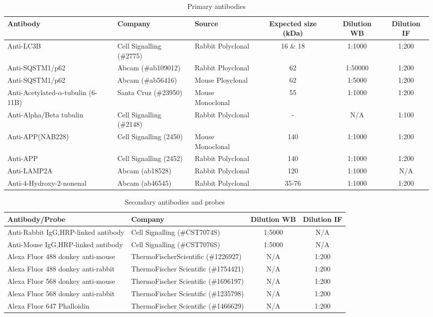 \begin{landscape}
\begin{table}[p]
\centering
\caption[Primary antibodies]{Primary antibodies}
\label{tab:20_prim}
\begin{tabular}{lllccc}
\toprule
Antibody & Company & Source & Expected size (kDa) & Dilution WB & Dilution IF \\
\midrule
Anti-LC3B & Cell Signalling (\#2775) & Rabbit Polyclonal & 16 \& 18 & 1:1000 & 1:200 \\
Anti-SQSTM1/p62 & Abcam (\#ab109012) & Rabbit Ployclonal & 62 & 1:50000 & 1:200 \\
Anti-SQSTM1/p62 & Abcam (\#ab56416) & Mouse Ployclonal & 62 & 1:5000 & 1:200 \\
Anti-Acetylated-$\alpha$-tubulin (6-11B) & Santa Cruz (\#23950) & Mouse Monoclonal & 55 & 1:1000 & 1:200 \\
Anti-Alpha/Beta tubulin & Cell Signalling (\#2148) & Rabbit Polyclonal & - & N/A & 1:100 \\
Anti-APP(NAB228) & Cell Signalling (2450) & Mouse Monoclonal & 140 & 1:1000 & 1:200 \\
Anti-APP & Cell Signalling (2452) & Rabbit Polyclonal & 140 & 1:1000 & 1:200 \\
Anti-LAMP2A & Abcam (ab18528) & Rabbit Polyclonal & 120 & 1:1000 & N/A \\
Anti-4-Hydroxy-2-nonenal & Abcam (ab46545) & Rabbit Polyclonal & 35-76 & 1:1000 & 1:200 \\
\bottomrule
\end{tabular}
\end{table}
\begin{table}[p]
\centering
\caption[Secondary antibodies and probes]{Secondary antibodies and probes}
\label{tab:20_sec}
\begin{tabular}{llcc}
\toprule
Antibody/Probe & Company & Dilution WB & Dilution IF \\
\midrule
Anti-Rabbit IgG,HRP-linked antibody & Cell Signalling (\#CST7074S) & 1:5000 & N/A \\
Anti-Mouse IgG,HRP-linked antibody & Cell Signalling (\#CST7076S) & 1:5000 & N/A \\
Alexa Fluor 488 donkey anti-mouse & ThermoFischerScientific (\#1226927) & N/A & 1:200 \\
Alexa Fluor 488 donkey anti-rabbit & ThermoFischer Scientific (\#1754421) & N/A & 1:200 \\
Alexa Fluor 568 donkey anti-mouse & ThermoFischer Scientific (\#1696197) & N/A & 1:200 \\
Alexa Fluor 568 donkey anti-rabbit & ThermoFischer Scientific (\#1235798) & N/A & 1:200 \\
Alexa Fluor 647 Phalloidin & ThermoFischer Scientific (\#1466629) & N/A & 1:200 \\
\bottomrule
\end{tabular}
\end{table}
\end{landscape}

